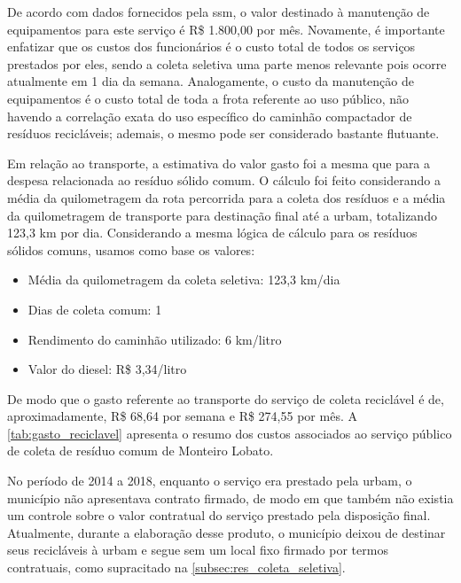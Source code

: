 De acordo com dados fornecidos pela \gls{ssm}, o valor destinado à manutenção de equipamentos para este serviço é R\$ 1.800,00 por mês. 
Novamente, é importante enfatizar que os custos dos funcionários é o custo total de todos os serviços prestados por eles, sendo a coleta seletiva uma parte menos relevante pois ocorre atualmente em 1 dia da semana. Analogamente, o custo da manutenção de equipamentos é o custo total de toda a frota referente ao uso público, não havendo a correlação exata do uso específico do caminhão compactador de resíduos recicláveis; ademais, o mesmo pode ser considerado bastante flutuante.

Em relação ao transporte, a estimativa do valor gasto foi a mesma que para a despesa relacionada ao resíduo sólido comum. O cálculo foi feito considerando a média da quilometragem da rota percorrida para a coleta dos resíduos e a média da quilometragem de transporte para destinação final até a \gls{urbam}, totalizando 123,3 km por dia. Considerando a mesma lógica de cálculo para os resíduos sólidos comuns, usamos como base os valores:

\begin{itemize}
	\item Média da quilometragem da coleta seletiva: 123,3 km/dia
	\item Dias de coleta comum: 1
	\item Rendimento do caminhão utilizado: 6 km/litro
	\item Valor do diesel: R\$ 3,34/litro
\end{itemize} 

De modo que o gasto referente ao transporte do serviço de coleta reciclável é de, aproximadamente, R\$ 68,64 por semana e R\$ 274,55 por mês. A \autoref{tab:gasto_reciclavel} apresenta o resumo dos custos associados ao serviço público de coleta de resíduo comum de Monteiro Lobato.



No período de 2014 a 2018, enquanto o serviço era prestado pela \gls{urbam}, o município não apresentava contrato firmado, de modo em que também não existia um controle sobre o valor contratual do serviço prestado pela disposição final. Atualmente, durante a elaboração desse produto, o município deixou de destinar seus recicláveis à \gls{urbam} e segue sem um local fixo firmado por termos contratuais, como supracitado na \autoref{subsec:res_coleta_seletiva}.


